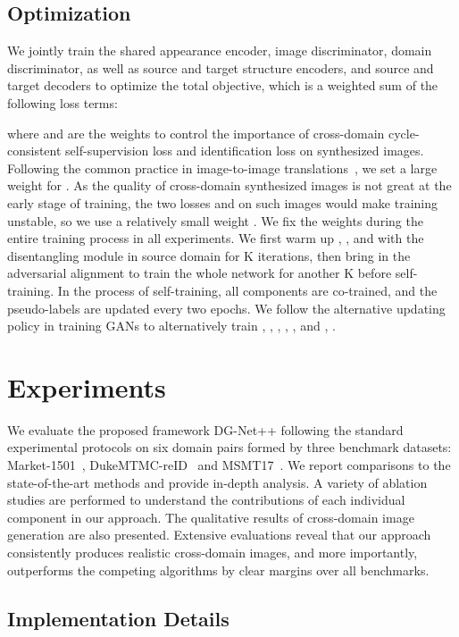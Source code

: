 \documentclass[runningheads]{llncs}
\begin{document}
\subsection{Optimization}

We jointly train the shared appearance encoder, image discriminator, domain discriminator, as well as source and target structure encoders, and source and target decoders to optimize the total objective, which is a weighted sum of the following loss terms:

\noindent where  and  are the weights to control the importance of cross-domain cycle-consistent self-supervision loss and identification loss on synthesized images. Following the common practice in image-to-image translations~\cite{Huang_2018_ECCV,lee2018diverse,zhu2017unpaired}, we set a large weight  for . As the quality of cross-domain synthesized images is not great at the early stage of training, the two losses  and  on such images would make training unstable, so we use a relatively small weight . We fix the weights during the entire training process in all experiments. We first warm up , ,  and  with the disentangling module in source domain for K iterations, then bring in the adversarial alignment to train the whole network for another K before self-training. In the process of self-training, all components are co-trained, and the pseudo-labels are updated every two epochs. We follow the alternative updating policy in training GANs to alternatively train , , , , , and , .




\section{Experiments}
We evaluate the proposed framework DG-Net++ following the standard experimental protocols on six domain pairs formed by three benchmark datasets: Market-1501~\cite{zheng2015scalable}, DukeMTMC-reID~\cite{dukemtmc} and MSMT17~\cite{wei2018person}. We report comparisons to the state-of-the-art methods and provide in-depth analysis. A variety of ablation studies are performed to understand the contributions of each individual component in our approach. The qualitative results of cross-domain image generation are also presented. Extensive evaluations reveal that our approach consistently produces realistic cross-domain images, and more importantly, outperforms the competing algorithms by clear margins over all benchmarks.   

\subsection{Implementation Details}
\end{document}

